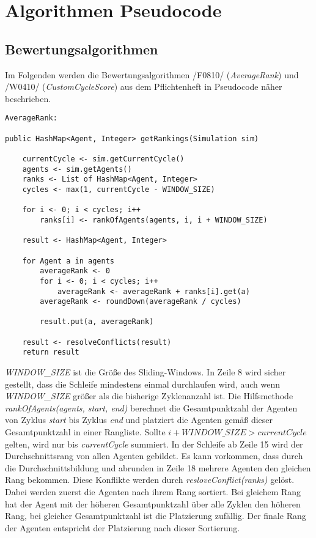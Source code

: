 \chapter{Algorithmen Pseudocode}

\section{Bewertungsalgorithmen}

Im Folgenden werden die Bewertungsalgorithmen /F0810/ (\emph{AverageRank}) und /W0410/ (\emph{CustomCycleScore}) aus dem Pflichtenheft in Pseudocode näher beschrieben. 

\begin{lstlisting}
AverageRank:

public HashMap<Agent, Integer> getRankings(Simulation sim) 
	
	currentCycle <- sim.getCurrentCycle()
	agents <- sim.getAgents()
	ranks <- List of HashMap<Agent, Integer>	
	cycles <- max(1, currentCycle - WINDOW_SIZE)
	
	for i <- 0; i < cycles; i++ 
		ranks[i] <- rankOfAgents(agents, i, i + WINDOW_SIZE)
	
	result <- HashMap<Agent, Integer>	
	
	for Agent a in agents
		averageRank <- 0
		for i <- 0; i < cycles; i++
			averageRank <- averageRank + ranks[i].get(a)
		averageRank <- roundDown(averageRank / cycles)
		
		result.put(a, averageRank)
	
	result <- resolveConflicts(result)
	return result
\end{lstlisting}
\emph{WINDOW\_SIZE} ist die Größe des Sliding-Windows. In Zeile 8 wird sicher gestellt, dass die Schleife mindestens einmal durchlaufen wird, auch wenn \emph{WINDOW\_SIZE} größer als die bisherige Zyklenanzahl ist.
Die Hilfsmethode \emph{rankOfAgents(agents, start, end)} berechnet die Gesamtpunktzahl der Agenten von Zyklus \emph{start} bis Zyklus \emph{end} und platziert die Agenten gemäß dieser Gesamtpunktzahl in einer Rangliste. Sollte $i + WINDOW\_SIZE > currentCycle$ gelten, wird nur bis \emph{currentCycle} summiert. 
In der Schleife ab Zeile 15 wird der Durchschnittsrang von allen Agenten gebildet.
Es kann vorkommen, dass durch die Durchschnittsbildung und abrunden in Zeile 18 mehrere Agenten den gleichen Rang bekommen. Diese Konflikte werden durch \emph{resloveConflict(ranks)} gelöst. Dabei werden zuerst die Agenten nach ihrem Rang sortiert. Bei gleichem Rang hat der Agent mit der höheren Gesamtpunktzahl über alle Zyklen den höheren Rang, bei gleicher Gesamtpunktzahl ist die Platzierung zufällig. Der finale Rang der Agenten entspricht der Platzierung nach dieser Sortierung.

